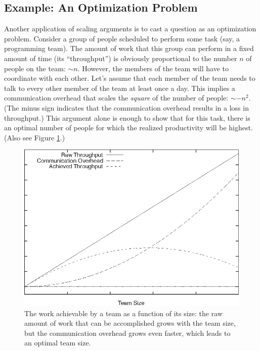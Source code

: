 \subsection{Example: An Optimization Problem}

 
Another application of scaling arguments is to cast a question as an
optimization problem. Consider a group of people scheduled to perform
some task (say, a programming team). The amount of work that this
group can perform in a fixed amount of time (its ``throughput'') is
obviously proportional to the number $n$ of people on the team: $\sim
n$. However, the members of the team will have to coordinate with each
other. Let's assume that each member of the team needs to talk to
every other member of the team at least once a day.  This implies a
communication overhead that scales the \emph{square} of the number of
people: $\sim -n^2$. (The minus sign indicates that the communication
overhead results in a loss in throughput.) This argument alone is
enough to show that for this task, there is an optimal number of people
for which the realized productivity will be highest. (Also see Figure
\ref{fig:scalingopt}.)

\begin{figure}
\centerline{\includegraphics{img/scalingopt}}
  \caption{The work achievable by a team as a function of its size:
    the raw amount of work that can be accomplished grows with the
    team size, but the communication overhead grows even faster, which
    leads to an optimal team size.}
  \label{fig:scalingopt}\vspace*{-12pt}
\end{figure}

